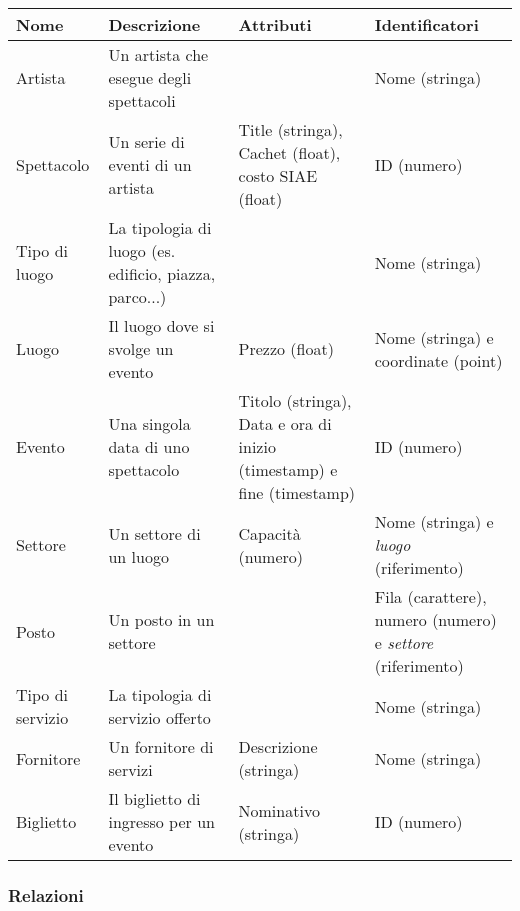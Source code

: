 \documentclass[a4paper,11pt]{article}
\begin{document}
\begin{tabularx}{\textwidth}{|X|>{\raggedright\arraybackslash}X|>{\raggedright\arraybackslash}X|>{\raggedright\arraybackslash}X|}
\hline
\textbf{Nome} & \textbf{Descrizione} & \textbf{Attributi} & \textbf{Identificatori}\\
\hline
Artista & Un artista che esegue degli spettacoli & & Nome (stringa)\\
\hline
Spettacolo & Un serie di eventi di un artista & Title (stringa), Cachet (float), costo SIAE (float) & ID (numero)\\
\hline
Tipo di luogo & La tipologia di luogo (es. edificio, piazza, parco...) & & Nome (stringa)\\
\hline
Luogo & Il luogo dove si svolge un evento & Prezzo (float) & Nome (stringa) e coordinate (point)\\
\hline
Evento & Una singola data di uno spettacolo & Titolo (stringa), Data e ora di inizio (timestamp) e fine (timestamp) & ID (numero)\\
\hline
Settore & Un settore di un luogo & Capacità (numero) & Nome (stringa) e \textit{luogo} (riferimento)\\
\hline
Posto & Un posto in un settore & & Fila (carattere), numero (numero) e \textit{settore} (riferimento)\\
\hline
Tipo di servizio & La tipologia di servizio offerto & & Nome (stringa)\\
\hline
Fornitore & Un fornitore di servizi & Descrizione (stringa) & Nome (stringa)\\
\hline
Biglietto & Il biglietto di ingresso per un evento & Nominativo (stringa) & ID (numero)\\
\hline
\end{tabularx}

\subsubsection*{Relazioni}
\end{document}

